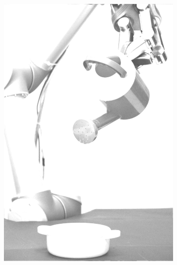 \begin{figure}[H]
\begin{subfigure}[b]{0.1\textwidth}
        \includegraphics[width=\textwidth]{img3/test/contrast_5_1_6_final_img3.png}
    \end{subfigure}
        \begin{subfigure}[b]{0.1\textwidth}

\end{subfigure}
\end{figure}
